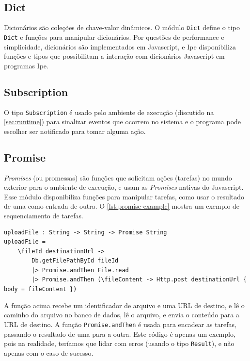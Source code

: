 \subsection{Dict}

Dicionários são coleções de chave-valor dinâmicos. O módulo \texttt{Dict} define
o tipo \texttt{Dict} e funções para manipular dicionários. Por questões de performance
e simplicidade, dicionários são implementados em Javascript, e Ipe disponibiliza funções e tipos que
possibilitam a interação com dicionários Javascript em programas Ipe.

\subsection{Subscription}

O tipo \texttt{Subscription} é usado pelo ambiente de execução (discutido na
\autoref{sec:runtime}) para sinalizar eventos que ocorrem no sistema e o programa
pode escolher ser notificado para tomar alguma ação.


\subsection{Promise}

\textit{Promises} (ou promessas) são funções que solicitam ações (tarefas) no mundo exterior para
o ambiente de execução, e usam as \textit{Promises} nativas do Javascript. Esse módulo disponibiliza
funções para manipular tarefas, como usar o resultado de uma como entrada de outra. O \autoref{lst:promise-example}
mostra um exemplo de sequenciamento de tarefas.

\begin{lstlisting}[label={lst:promise-example},caption={Exemplo de sequenciamento de tarefas}]
uploadFile : String -> String -> Promise String
uploadFile =
    \fileId destinationUrl ->
        Db.getFilePathById fileId
        |> Promise.andThen File.read
        |> Promise.andThen (\fileContent -> Http.post destinationUrl { body = fileContent })
\end{lstlisting}

A função acima recebe um identificador de arquivo e uma URL de destino, e lê
o caminho do arquivo no banco de dados, lê o arquivo, e envia o conteúdo para
a URL de destino. A função \texttt{Promise.andThen} é usada para encadear as tarefas,
passando o resultado de uma para a outra. Este código é apenas um exemplo, pois
na realidade, teríamos que lidar com erros (usando o tipo \texttt{Result}), e
não apenas com o caso de sucesso.

